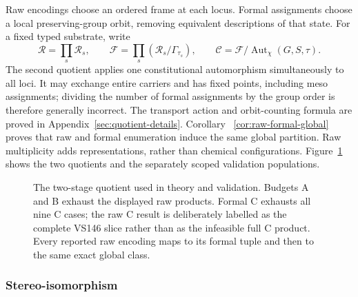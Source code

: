 \documentclass[pdflatex,sn-mathphys-num,referee,lineno]{sn-jnl}
\theoremstyle{plain}
\theoremstyle{remark}
\theoremstyle{definition}
\begin{document}
Raw encodings choose an ordered frame at each locus. Formal assignments
choose a local preserving-group orbit, removing equivalent descriptions of
that state. For a fixed typed substrate, write
\[
 \mathcal R=\prod_s\mathcal R_s,\qquad
 \mathcal F=\prod_s(\mathcal R_s/\Gamma_{\tau_s}),\qquad
 \mathcal C=\mathcal F/\operatorname{Aut}_\chi(G,S,\tau).
\]
The second quotient applies one constitutional automorphism simultaneously to
all loci. It may exchange entire carriers and has fixed points, including meso
assignments; dividing the number of formal assignments by the group order is
therefore generally incorrect. The transport action and orbit-counting formula
are proved in Appendix~\ref{sec:quotient-details}. Corollary~
\ref{cor:raw-formal-global} proves that raw and formal enumeration induce the
same global partition. Raw multiplicity adds representations, rather than
chemical configurations.
Figure~\ref{fig:quotient-hierarchy} shows the two quotients and the separately
scoped validation populations.

\begin{figure}[htbp]
  \centering
  \resizebox{0.98\textwidth}{!}{}
  \caption{The two-stage quotient used in theory and validation.  Budgets A
  and B exhaust the displayed raw products.  Formal C exhausts all nine C
  cases; the raw C result is deliberately labelled as the complete VS146
  slice rather than as the infeasible full C product.  Every reported raw
  encoding maps to its formal tuple and then to the same exact global class.}
  \label{fig:quotient-hierarchy}
\end{figure}

\subsubsection{Stereo-isomorphism}
\end{document}
